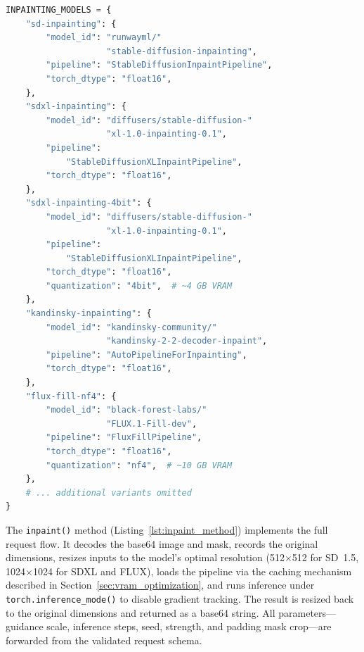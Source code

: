 \documentclass[12pt,a4paper]{report}
\begin{document}
\begin{lstlisting}[language=Python, caption={Declarative model configuration dictionary (excerpt from \texttt{diffusion.py})}, label={lst:inpainting_models}]
INPAINTING_MODELS = {
    "sd-inpainting": {
        "model_id": "runwayml/"
                    "stable-diffusion-inpainting",
        "pipeline": "StableDiffusionInpaintPipeline",
        "torch_dtype": "float16",
    },
    "sdxl-inpainting": {
        "model_id": "diffusers/stable-diffusion-"
                    "xl-1.0-inpainting-0.1",
        "pipeline":
            "StableDiffusionXLInpaintPipeline",
        "torch_dtype": "float16",
    },
    "sdxl-inpainting-4bit": {
        "model_id": "diffusers/stable-diffusion-"
                    "xl-1.0-inpainting-0.1",
        "pipeline":
            "StableDiffusionXLInpaintPipeline",
        "torch_dtype": "float16",
        "quantization": "4bit",  # ~4 GB VRAM
    },
    "kandinsky-inpainting": {
        "model_id": "kandinsky-community/"
                    "kandinsky-2-2-decoder-inpaint",
        "pipeline": "AutoPipelineForInpainting",
        "torch_dtype": "float16",
    },
    "flux-fill-nf4": {
        "model_id": "black-forest-labs/"
                    "FLUX.1-Fill-dev",
        "pipeline": "FluxFillPipeline",
        "torch_dtype": "float16",
        "quantization": "nf4",  # ~10 GB VRAM
    },
    # ... additional variants omitted
}
\end{lstlisting}

The \texttt{inpaint()} method (Listing~\ref{lst:inpaint_method}) implements the full request flow. It decodes the base64 image and mask, records the original dimensions, resizes inputs to the model's optimal resolution (512$\times$512 for SD~1.5, 1024$\times$1024 for SDXL and FLUX), loads the pipeline via the caching mechanism described in Section~\ref{sec:vram_optimization}, and runs inference under \texttt{torch.inference\_mode()} to disable gradient tracking. The result is resized back to the original dimensions and returned as a base64 string. All parameters---guidance scale, inference steps, seed, strength, and padding mask crop---are forwarded from the validated request schema.
\end{document}
